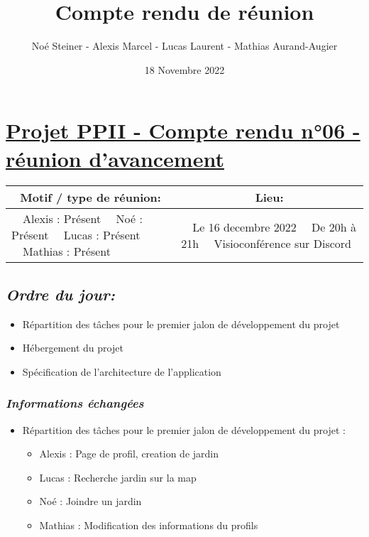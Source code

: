\documentclass[french,a4paper]{article}
\author{Noé Steiner - Alexis Marcel - Lucas Laurent - Mathias Aurand-Augier}
\date{18 Novembre 2022}
\newcommand{\tabitem}{\textbullet~~}\title{Compte rendu de réunion}
\begin{document}
\maketitle

\section*{\underline{Projet PPII - Compte rendu n°06 - réunion d'avancement}}

\begin{table}[!htb]
  \centering
  \begin{tabular}{| p{7cm} | p{7cm} |}
    \hline
    \multicolumn{1}{|c|}{ Motif / type de réunion:} & \multicolumn{1}{c|}{Lieu:} \\
    \hline
    \tabitem Alexis : Présent\newline
    \tabitem Noé : Présent\newline
    \tabitem Lucas : Présent\newline
    \tabitem Mathias : Présent                      &
    \tabitem Le 16 decembre 2022\newline
    \tabitem De 20h à 21h\newline
    \tabitem Visioconférence sur Discord                                         \\
    \hline
  \end{tabular}
\end{table}

\subsection*{\textit{Ordre du jour:}}

\begin{itemize}
  \item Répartition des tâches pour le premier jalon de développement du projet
  \item Hébergement du projet
  \item Spécification de l'architecture de l'application
\end{itemize}

\subsubsection*{\textit{Informations échangées}}
\begin{itemize}
  \item Répartition des tâches pour le premier jalon de développement du projet :
    \begin{itemize}
      \item Alexis : Page de profil, creation de jardin
      \item Lucas : Recherche jardin sur la map
      \item Noé : Joindre un jardin
      \item Mathias : Modification des informations du profils
    \end{itemize}
\end{itemize}
\end{document}
